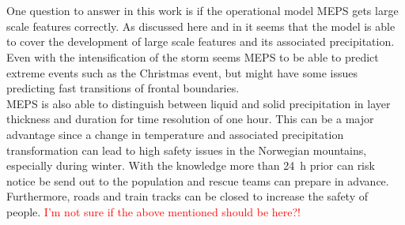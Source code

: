\\
\\
One question to answer in this work is if the operational model MEPS gets large scale features correctly. As discussed here and in  it seems that the model is able to cover the development of large scale features and its associated precipitation. Even with the intensification of the storm seems MEPS to be able to predict extreme events such as the Christmas event, but might have some issues predicting fast transitions of frontal boundaries. 
\\
MEPS is also able to distinguish between liquid and solid precipitation in layer thickness and duration for time resolution of one hour. This can be a major advantage since a change in temperature and associated precipitation transformation can lead to high safety issues in the Norwegian mountains, especially during winter. With the knowledge more than \SI{24}{\hour} prior can risk notice be send out to the population and rescue teams can prepare in advance. Furthermore, roads and train tracks can be closed to increase the safety of people.
\textcolor{red}{I'm not sure if the above mentioned should be here?! }

